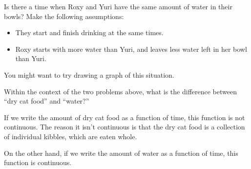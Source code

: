 \documentclass{ximera}
\begin{document}
\begin{problem}
  Is there a time when Roxy and Yuri have the same amount of water in
  their bowls? Make the following assumptions:
  \begin{itemize}
  \item They start and finish drinking at the same times.
  \item Roxy starts with more water than Yuri, and leaves less water
    left in her bowl than Yuri.
  \end{itemize}
    \begin{hint}
  	You might want to try drawing a graph of this situation.
    \end{hint}
    \begin{prompt}
    \begin{multipleChoice}
    \end{multipleChoice}
    \end{prompt}
\end{problem}



\begin{problem}
  Within the context of the two problems above, what is the difference
  between ``dry cat food'' and ``water?''
  \begin{freeResponse}
    If we write the amount of dry cat food as a function of time, this function
    is not continuous.  The reason it isn't continuous is that the dry cat food
    is a collection of individual kibbles, which are eaten whole.
    
    On the other hand, if we write the amount of water as a function of time, 
    this function is continuous.
  \end{freeResponse}
\end{problem}

%
\end{document}
